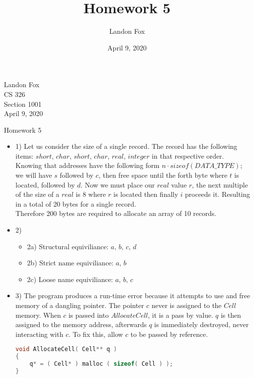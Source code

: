 \documentclass[ 12pt ]{article}
\begin{document}
\title{Homework 5}
\author{Landon Fox}
\date{April 9, 2020}

\begin{flushleft}
Landon Fox \\
CS 326 \\
Section 1001 \\
April 9, 2020
\end{flushleft}
\begin{center}
\Large Homework 5
\end{center}

\begin{itemize}
	\item[] {\large 1)}
	Let us consider the size of a single record. The record has the following
	items: $short$, $char$, $short$, $char$, $real$, $integer$ in that respective
	order. Knowing that addresses have the following form $n \cdot sizeof( DATA\_TYPE )$;
	we will have $s$ followed by $c$, then free space until the forth byte where $t$ is
	located, followed by $d$. Now we must place our $real$ value $r$, the next multiple
	of the size of a $real$ is 8 where $r$ is located then finally $i$ proceeds it.
	Resulting in a total of 20 bytes for a single record. \\
	Therefore 200 bytes are required to allocate an array of 10 records. \\

	\item[] {\large 2)}
	\begin{itemize}
		\item[] {\large 2a)}
		Structural equiviliance: $a,\, b,\, c,\, d$ \\

		\item[] {\large 2b)}
		Strict name equiviliance: $a,\, b$ \\

		\item[] {\large 2c)}
		Loose name equiviliance: $a,\, b,\, c$ \\
	\end{itemize}

	\item[] {\large 3)}
	The program produces a run-time error because it attempts to use and free
	memory of a dangling pointer. The pointer $c$ never is assigned to the $Cell$
	memory. When $c$ is passed into $AllocateCell$, it is a pass by value. $q$ 
	is then assigned to the memory address, afterwards $q$ is immediately destroyed, 
	never interacting with $c$. To fix this, allow $c$ to be passed by reference.
	\begin{lstlisting}[language=C]
void AllocateCell( Cell** q )
{
	q* = ( Cell* ) malloc ( sizeof( Cell ) );
}


\end{lstlisting}
\end{itemize}
\end{document}
